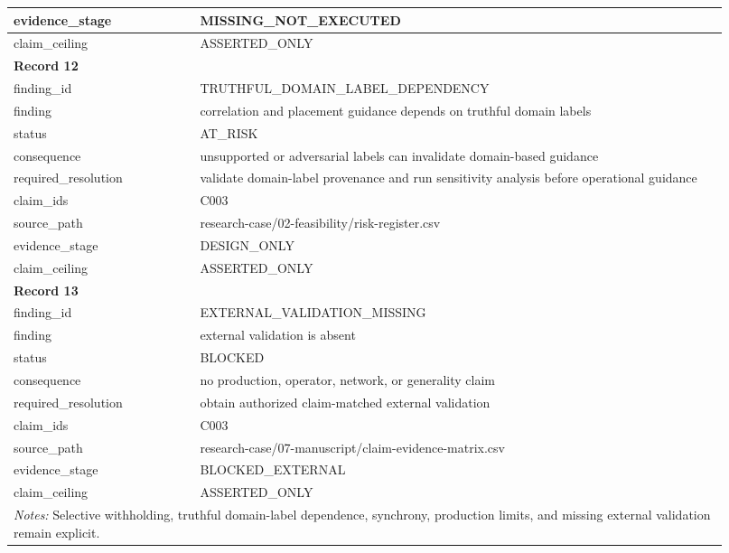 \begin{longtable}{|p{0.24\linewidth}|p{0.68\linewidth}|}
evidence\_\allowbreak{}stage & MISSING\_\allowbreak{}NOT\_\allowbreak{}EXECUTED \\ \hline
claim\_\allowbreak{}ceiling & ASSERTED\_\allowbreak{}ONLY \\ \hline
\multicolumn{2}{|l|}{\textbf{Record 12}} \\ \hline
finding\_\allowbreak{}id & TRUTHFUL\_\allowbreak{}DOMAIN\_\allowbreak{}LABEL\_\allowbreak{}DEPENDENCY \\ \hline
finding & correlation and placement guidance depends on truthful domain labels \\ \hline
status & AT\_\allowbreak{}RISK \\ \hline
consequence & unsupported or adversarial labels can invalidate domain-based guidance \\ \hline
required\_\allowbreak{}resolution & validate domain-label provenance and run sensitivity analysis before operational guidance \\ \hline
claim\_\allowbreak{}ids & C003 \\ \hline
source\_\allowbreak{}path & research-case/02-feasibility/risk-register.csv \\ \hline
evidence\_\allowbreak{}stage & DESIGN\_\allowbreak{}ONLY \\ \hline
claim\_\allowbreak{}ceiling & ASSERTED\_\allowbreak{}ONLY \\ \hline
\multicolumn{2}{|l|}{\textbf{Record 13}} \\ \hline
finding\_\allowbreak{}id & EXTERNAL\_\allowbreak{}VALIDATION\_\allowbreak{}MISSING \\ \hline
finding & external validation is absent \\ \hline
status & BLOCKED \\ \hline
consequence & no production, operator, network, or generality claim \\ \hline
required\_\allowbreak{}resolution & obtain authorized claim-matched external validation \\ \hline
claim\_\allowbreak{}ids & C003 \\ \hline
source\_\allowbreak{}path & research-case/07-manuscript/claim-evidence-matrix.csv \\ \hline
evidence\_\allowbreak{}stage & BLOCKED\_\allowbreak{}EXTERNAL \\ \hline
claim\_\allowbreak{}ceiling & ASSERTED\_\allowbreak{}ONLY \\ \hline
\multicolumn{2}{|p{0.92\linewidth}|}{\textit{Notes:} Selective withholding, truthful domain-label dependence, synchrony, production limits, and missing external validation remain explicit.} \\ \hline
\end{longtable}
\endgroup
